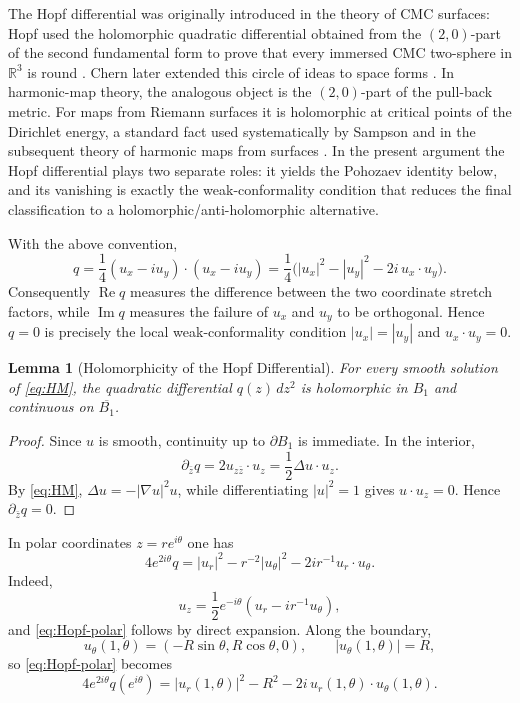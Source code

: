 \documentclass[11pt]{amsart}
\numberwithin{equation}{section}
\newtheorem{lemma}[theorem]{Lemma}
\theoremstyle{remark}
\newcommand{\R}{\mathbb{R}}
\begin{document}
The Hopf differential was originally introduced in the theory of CMC surfaces: Hopf used the holomorphic quadratic differential obtained from
the \((2,0)\)-part of the second fundamental form to prove that every immersed CMC two-sphere in \(\R^3\) is round \cite{Hopf1951}. Chern
later extended this circle of ideas to space forms \cite{Chern1983}. In harmonic-map theory, the analogous object is the \((2,0)\)-part of the
pull-back metric. For maps from Riemann surfaces it is holomorphic at critical points of the Dirichlet energy, a standard fact used
systematically by Sampson and in the subsequent theory of harmonic maps from surfaces \cite{Sampson1978,EellsWood1983,Helein}. In the present
argument the Hopf differential plays two separate roles: it yields the Pohozaev identity below, and its vanishing is exactly the
weak-conformality condition that reduces the final classification to a holomorphic/anti-holomorphic alternative.

With the above convention,
\[
q=\frac14(u_x-iu_y)\cdot(u_x-iu_y)
=\frac14\bigl(|u_x|^2-|u_y|^2-2i\,u_x\cdot u_y\bigr).
\]
Consequently \(\operatorname{Re}q\) measures the difference between the two coordinate stretch factors, while \(\operatorname{Im}q\) measures
the failure of \(u_x\) and \(u_y\) to be orthogonal. Hence \(q=0\) is precisely the local weak-conformality condition \(|u_x|=|u_y|\) and
\(u_x\cdot u_y=0\).

\begin{lemma}[Holomorphicity of the Hopf Differential]\label{lem:hopf-holomorphic}
For every smooth solution of \eqref{eq:HM}, the quadratic differential $q(z)\,dz^2$ is holomorphic in $B_1$ and continuous on
$\overline{B_1}$.
\end{lemma}

\begin{proof}
Since $u$ is smooth, continuity up to $\partial B_1$ is immediate. In the interior,
\[
\partial_{\bar z}q=2u_{z\bar z}\cdot u_z=\frac12\Delta u\cdot u_z.
\]
By \eqref{eq:HM}, $\Delta u=-|\nabla u|^2u$, while differentiating $|u|^2=1$ gives $u\cdot u_z=0$. Hence $\partial_{\bar z}q=0$.
\end{proof}

In polar coordinates $z=re^{i\theta}$ one has
\begin{equation}\label{eq:Hopf-polar}
4e^{2i\theta}q
=
|u_r|^2-r^{-2}|u_\theta|^2-2ir^{-1}u_r\cdot u_\theta.
\end{equation}
Indeed,
\[
u_z=\frac12e^{-i\theta}(u_r-ir^{-1}u_\theta),
\]
and \eqref{eq:Hopf-polar} follows by direct expansion. Along the boundary,
\[
u_\theta(1,\theta)=(-R\sin\theta,R\cos\theta,0),
\qquad |u_\theta(1,\theta)|=R,
\]
so \eqref{eq:Hopf-polar} becomes
\begin{equation}\label{eq:Hopf-boundary}
4e^{2i\theta}q(e^{i\theta})
=
|u_r(1,\theta)|^2-R^2-2i\,u_r(1,\theta)\cdot u_\theta(1,\theta).
\end{equation}
\end{document}
